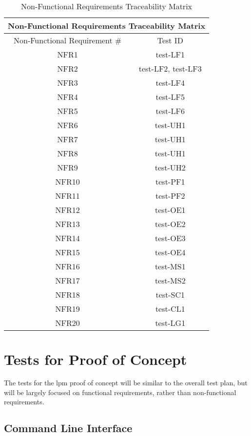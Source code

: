 \documentclass[12pt, titlepage]{article}
\begin{document}
\begin{table}[H]
    \centering
    \begin{tabular}{|c|c|}
\hline
\multicolumn{2}{|c|}{Non-Functional Requirements Traceability Matrix} \\ \hline
Non-Functional Requirement \# & Test ID \\ \hline
NFR1 & test-LF1 \\ \hline
NFR2 & test-LF2, test-LF3 \\ \hline
NFR3 & test-LF4 \\ \hline
NFR4 & test-LF5 \\ \hline
NFR5 & test-LF6 \\ \hline
NFR6 & test-UH1 \\ \hline
NFR7 & test-UH1 \\ \hline
NFR8 & test-UH1 \\ \hline
NFR9 & test-UH2 \\ \hline
NFR10 & test-PF1 \\ \hline
NFR11 & test-PF2 \\ \hline
NFR12 & test-OE1 \\ \hline
NFR13 & test-OE2 \\ \hline
NFR14 & test-OE3 \\ \hline
NFR15 & test-OE4 \\ \hline
NFR16 & test-MS1 \\ \hline
NFR17 & test-MS2 \\ \hline
NFR18 & test-SC1 \\ \hline
NFR19 & test-CL1 \\ \hline
NFR20 & test-LG1 \\ \hline
\end{tabular}
    \caption{Non-Functional Requirements Traceability Matrix}
    \label{tab:nfrtrace}
\end{table}


\section{Tests for Proof of Concept}

The tests for the lpm proof of concept will be similar to the overall test plan, but will be largely focused on functional requirements, rather than non-functional requirements.

\subsection{Command Line Interface}
\end{document}
